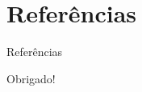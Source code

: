 \documentclass[aspectratio=169]{beamer}
\begin{document}
\section{Referências}

\begin{frame}[allowframebreaks]{Referências}

\end{frame}
\begin{frame}{}
\centering
    \Huge Obrigado!
\end{frame}
\end{document}
